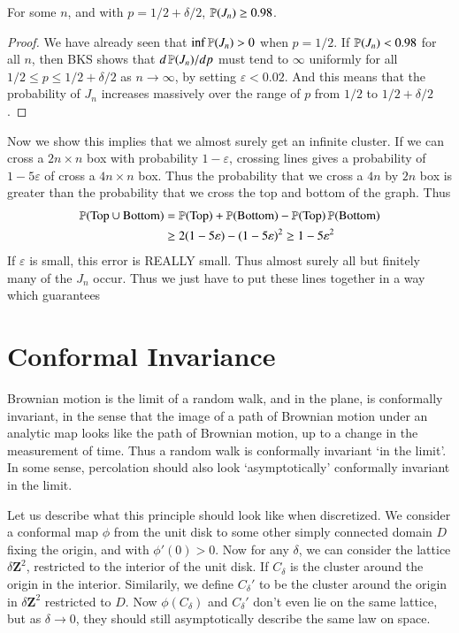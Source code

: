 \begin{lemma}
    For some $n$, and with $p = 1/2 + \delta/2$, $\operatorname{\mathbb{P}}(J_n) \geq 0.98$.
\end{lemma}
\begin{proof}
    We have already seen that $\inf \operatorname{\mathbb{P}}(J_n) > 0$ when $p = 1/2$. If $\operatorname{\mathbb{P}}(J_n) < 0.98$ for all $n$, then BKS shows that $d\operatorname{\mathbb{P}}(J_n)/dp$ must tend to $\infty$ uniformly for all $1/2 \leq p \leq 1/2 + \delta/2$ as $n \to \infty$, by setting $\varepsilon < 0.02$. And this means that the probability of $J_n$ increases massively over the range of $p$ from $1/2$ to $1/2 + \delta/2$.
\end{proof}

Now we show this implies that we almost surely get an infinite cluster. If we can cross a $2n \times n$ box with probability $1 - \varepsilon$, crossing lines gives a probability of $1 - 5 \varepsilon$ of cross a $4n \times n$ box. Thus the probability that we cross a $4n$ by $2n$ box is greater than the probability that we cross the top and bottom of the graph. Thus
%
\begin{align*}
    \operatorname{\mathbb{P}}(\text{Top} \cup \text{Bottom}) &= \operatorname{\mathbb{P}}(\text{Top}) + \operatorname{\mathbb{P}}(\text{Bottom}) - \operatorname{\mathbb{P}}(\text{Top}) \operatorname{\mathbb{P}}(\text{Bottom})\\
    &\geq 2(1 - 5\varepsilon) - (1 - 5\varepsilon)^2 \geq 1 - 5 \varepsilon^2
\end{align*}
%
If $\varepsilon$ is small, this error is REALLY small. Thus almost surely all but finitely many of the $J_n$ occur. Thus we just have to put these lines together in a way which guarantees

\section{Conformal Invariance}

Brownian motion is the limit of a random walk, and in the plane, is conformally invariant, in the sense that the image of a path of Brownian motion under an analytic map looks like the path of Brownian motion, up to a change in the measurement of time. Thus a random walk is conformally invariant `in the limit'. In some sense, percolation should also look `asymptotically' conformally invariant in the limit.

Let us describe what this principle should look like when discretized. We consider a conformal map $\phi$ from the unit disk to some other simply connected domain $D$ fixing the origin, and with $\phi'(0) > 0$. Now for any $\delta$, we can consider the lattice $\delta \mathbf{Z}^2$, restricted to the interior of the unit disk. If $C_\delta$ is the cluster around the origin in the interior. Similarily, we define $C_\delta'$ to be the cluster around the origin in $\delta \mathbf{Z}^2$ restricted to $D$. Now $\phi(C_\delta)$ and $C_\delta'$ don't even lie on the same lattice, but as $\delta \to 0$, they should still asymptotically describe the same law on space.

